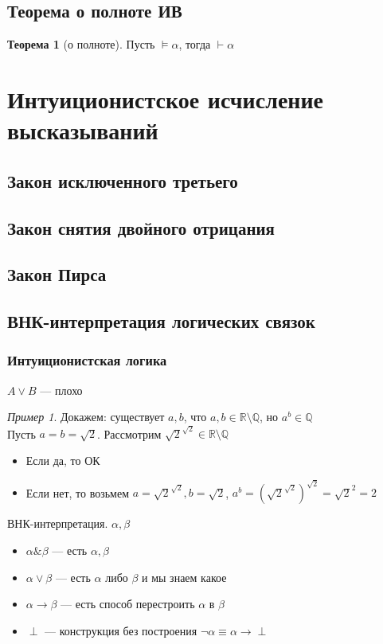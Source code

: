 \documentclass[english]{article}
\newcommand{\R}{\mathbb{R}}
\theoremstyle{plain}
\theoremstyle{remark}
\newtheorem*{examp}{Пример}
\theoremstyle{definition}
\newtheorem{theorem}{Теорема}[section]
\begin{document}
\subsection{Теорема о полноте ИВ}
\label{sec:org202bd16}
\begin{theorem}[о полноте]
Пусть \(\vDash \alpha\), тогда \(\vdash \alpha\)
\label{org161eea2}
\end{theorem}
\section{Интуиционистское исчисление высказываний}
\label{sec:org052aff2}
\subsection{Закон исключенного третьего}
\label{sec:org561d599}
\subsection{Закон снятия двойного отрицания}
\label{sec:org0419966}
\subsection{Закон Пирса}
\label{sec:orgb41cfa0}
\subsection{ВНК-интерпретация логических связок}
\label{sec:org837a83a}
\subsubsection{Интуиционистская логика}
\label{sec:orgb5125f3}
\(A \vee B\) --- плохо
\begin{examp}
Докажем: существует \(a, b\), что \(a, b \in \R \setminus \mathbb{Q}\), но \(a^b \in \mathbb{Q}\) \\
Пусть \(a = b = \sqrt{2}\). Рассмотрим \(\sqrt{2}^{\sqrt{2}} \in \R \setminus \mathbb{Q}\)
\begin{itemize}
\item Если да, то ОК
\item Если нет, то возьмем \(a = \sqrt{2}^{\sqrt{2}}, b = \sqrt{2}\), \(a^b = (\sqrt{2}^{\sqrt{2}})^{\sqrt{2}} = \sqrt{2}^{2} = 2\)
\end{itemize}
\end{examp}
\begin{defintion}
ВНК-интерпретация. \(\alpha, \beta\)
\begin{itemize}
\item \(\alpha \& \beta\) --- есть \(\alpha, \beta\)
\item \(\alpha \vee \beta\) --- есть \(\alpha\) либо \(\beta\) и мы знаем какое
\item \(\alpha \to \beta\) --- есть способ перестроить \(\alpha\) в \(\beta\)
\item \(\perp\) --- конструкция без построения \(\neg \alpha \equiv \alpha \to \perp\)
\end{itemize}
\end{defintion}
\end{document}
